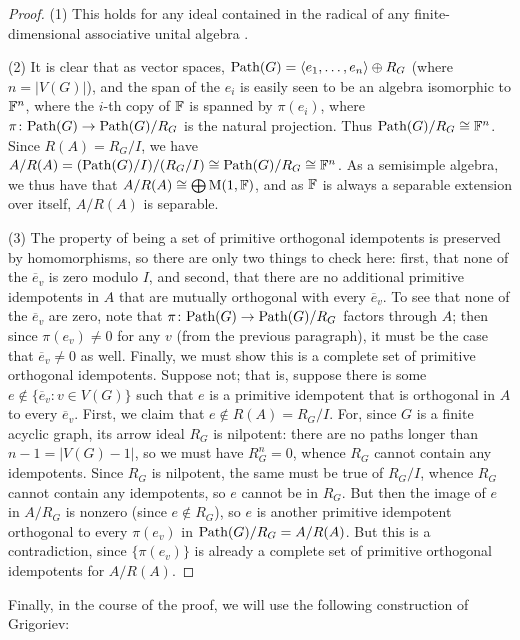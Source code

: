 \documentclass[11pt]{article}
\begin{document}
\begin{proof}
(1) This holds for any ideal contained in the radical of any finite-dimensional associative unital algebra \cite[Prop.~4.6]{lam}. 

(2) It is clear that as vector spaces, $\text{Path}(G) = \langle e_1, \dotsc, e_n 
\rangle \oplus R_G$ (where $n=|V(G)|$), and the span of the $e_i$ is easily seen 
to be an algebra isomorphic to $\mathbb{F}^n$, where the $i$-th copy of $\mathbb{F}$ is spanned by 
$\pi(e_i)$, where $\pi\colon \text{Path}(G) \to \text{Path}(G) / R_G$ is the natural 
projection. Thus $\text{Path}(G) / R_G \cong \mathbb{F}^n$. Since $R(A) = R_G / I$, we have $A / 
R(A) = (\text{Path}(G) / I) / (R_G / I) \cong \text{Path}(G) / R_G \cong \mathbb{F}^n$. As a 
semisimple algebra, we thus have that $A/R(A) \cong \bigoplus \mathrm{M}(1,\mathbb{F})$, and as 
$\mathbb{F}$ is always a separable extension over itself, $A/R(A)$ is separable.

(3) The property of being a set of primitive orthogonal idempotents is preserved 
by homomorphisms, so there are only two things to check here: first, that none of 
the $\overline{e}_v$ is zero modulo $I$, and second, that there are no additional 
primitive idempotents in $A$ that are mutually orthogonal with every $\overline{e}_v$. To see that none of the $\overline{e}_v$ are zero, 
note that $\pi\colon \text{Path}(G) \to \text{Path}(G) / R_G$ factors through $A$; then since 
$\pi(e_v) \neq 0$ for any $v$ (from the previous paragraph), it must be the case 
that $\overline{e}_v \neq 0$ as well. Finally, we must show this is a complete set 
of primitive orthogonal idempotents. Suppose not; that is, suppose there is some 
$e \notin \{\overline{e}_v : v \in V(G)\}$ such that $e$ is a primitive idempotent 
that is orthogonal in $A$ to every $\overline{e}_v$. First, we claim that $e 
\notin R(A) = R_G / I$. For, since $G$ is a finite acyclic graph, its arrow ideal 
$R_G$ is nilpotent: there are no paths longer than $n-1=|V(G)-1|$, so we must have 
$R_G^n = 0$, whence $R_G$ cannot contain any idempotents. Since $R_G$ is 
nilpotent, the same must be true of $R_G / I$, whence $R_G$ cannot contain any 
idempotents, so $e$ cannot be in $R_G$. But then the image of $e$ in $A/R_G$ is 
nonzero (since $e \notin R_G$), so $e$ is another primitive idempotent orthogonal 
to every $\pi(e_v)$ in $\text{Path}(G) / R_G = A / R(A)$. But this is a contradiction, 
since $\{\pi(e_v)\}$ is already a complete set of primitive orthogonal idempotents 
for $A/R(A)$.
\end{proof}

Finally, in the course of the proof, we will use the following construction of Grigoriev:
\end{document}

